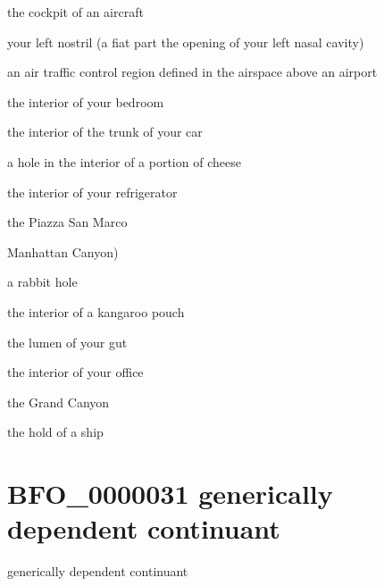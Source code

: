 \documentclass[letterpaper,10pt,english]{sphinxmanual}
\begin{document}
\begin{sphinxShadowBox}

\sphinxAtStartPar
the cockpit of an aircraft

\sphinxAtStartPar
your left nostril (a fiat part \textendash{} the opening \textendash{} of your left nasal cavity)

\sphinxAtStartPar
an air traffic control region defined in the airspace above an airport

\sphinxAtStartPar
the interior of your bedroom

\sphinxAtStartPar
the interior of the trunk of your car

\sphinxAtStartPar
a hole in the interior of a portion of cheese

\sphinxAtStartPar
the interior of your refrigerator

\sphinxAtStartPar
the Piazza San Marco

\sphinxAtStartPar
Manhattan Canyon)

\sphinxAtStartPar
a rabbit hole

\sphinxAtStartPar
the interior of a kangaroo pouch

\sphinxAtStartPar
the lumen of your gut

\sphinxAtStartPar
the interior of your office

\sphinxAtStartPar
the Grand Canyon

\sphinxAtStartPar
the hold of a ship
\end{sphinxShadowBox}

\begin{sphinxShadowBox}

\sphinxAtStartPar
{}
\end{sphinxShadowBox}
\begin{quote}
\label{\detokenize{doc-BFO_0000031:bfo-0000031}}\label{\detokenize{doc-BFO_0000031:generically-dependent-continuant}}\label{\detokenize{doc-BFO_0000031:bfo-0000031}}
\ignorespaces \end{quote}


\section{BFO\_0000031 \sphinxhyphen{} generically dependent continuant}
\label{\detokenize{doc-BFO_0000031:bfo-0000031-generically-dependent-continuant}}\label{\detokenize{doc-BFO_0000031:index-0}}\label{\detokenize{doc-BFO_0000031::doc}}
\begin{sphinxShadowBox}

\sphinxAtStartPar
generically dependent continuant
\end{sphinxShadowBox}
\end{document}
